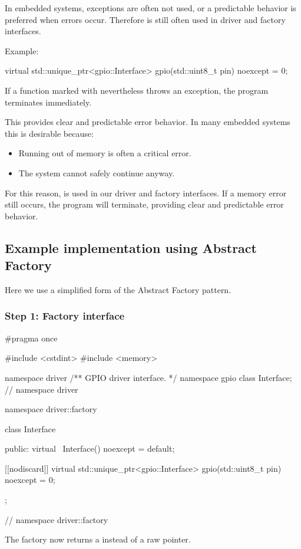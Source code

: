 In embedded systems, exceptions are often not used, or a predictable behavior is preferred when
errors occur. Therefore  is still often used in driver and factory interfaces.

Example:

\begin{cppcode}
virtual std::unique_ptr<gpio::Interface> gpio(std::uint8_t pin) noexcept = 0;
\end{cppcode}

\noindent If a function marked with  nevertheless throws an exception, the program
terminates immediately.

This provides clear and predictable error behavior. In many embedded systems this is desirable
because:
\begin{itemize}
  \item Running out of memory is often a critical error.
  \item The system cannot safely continue anyway.
\end{itemize}
For this reason,  is used in our driver and factory interfaces. If a memory error
still occurs, the program will terminate, providing clear and predictable error behavior.

\subsection{Example implementation using Abstract Factory}
\label{c4:sec:smartexample}
Here we use a simplified form of the Abstract Factory pattern.

\subsubsection{Step 1: Factory interface}

\begin{cppcode}
#pragma once

#include <cstdint>
#include <memory>

namespace driver
{
/** GPIO driver interface. */
namespace gpio { class Interface; }
} // namespace driver

namespace driver::factory
{
class Interface
{
public:
    virtual ~Interface() noexcept = default;

    [[nodiscard]] virtual std::unique_ptr<gpio::Interface> gpio(std::uint8_t pin) noexcept = 0;
};
} // namespace driver::factory
\end{cppcode}

\noindent The factory now returns a  instead of a raw pointer.

